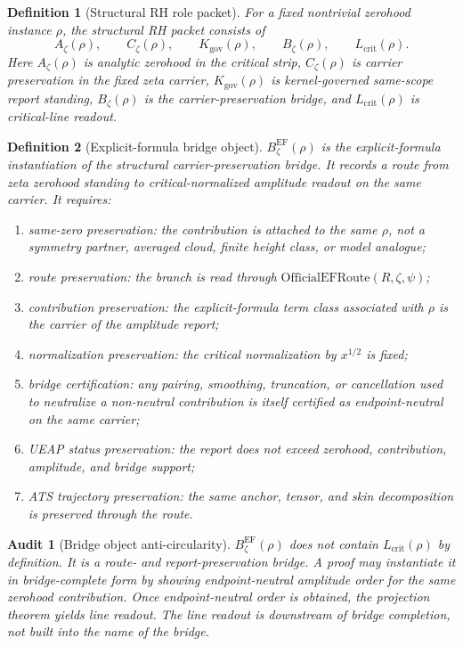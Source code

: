 \documentclass[11pt]{article}
\newtheorem{definition}{Definition}[section]
\newtheorem{audit}{Audit}[section]
\newcommand{\Az}{A_{\zeta}}
\newcommand{\Lcrit}{L_{\mathrm{crit}}}
\newcommand{\OfficialEFRoute}{\mathrm{OfficialEFRoute}}
\newcommand{\BzetaEF}{B^{\mathrm{EF}}_{\zeta}}
\newcommand{\Czeta}{C_{\zeta}}
\newcommand{\Kgov}{K_{\mathrm{gov}}}
\begin{document}
\begin{definition}[Structural RH role packet]
For a fixed nontrivial zerohood instance \(\rho\), the structural RH packet consists of
\[
\Az(\rho),\qquad \Czeta(\rho),\qquad \Kgov(\rho),\qquad B_\zeta(\rho),\qquad \Lcrit(\rho).
\]
Here \(\Az(\rho)\) is analytic zerohood in the critical strip, \(\Czeta(\rho)\) is carrier preservation in the fixed zeta carrier, \(\Kgov(\rho)\) is kernel-governed same-scope report standing, \(B_\zeta(\rho)\) is the carrier-preservation bridge, and \(\Lcrit(\rho)\) is critical-line readout.
\end{definition}

\begin{definition}[Explicit-formula bridge object]
\(\BzetaEF(\rho)\) is the explicit-formula instantiation of the structural carrier-preservation bridge.  It records a route from zeta zerohood standing to critical-normalized amplitude readout on the same carrier.  It requires:
\begin{enumerate}[label=(B\arabic*)]
\item same-zero preservation: the contribution is attached to the same \(\rho\), not a symmetry partner, averaged cloud, finite height class, or model analogue;
\item route preservation: the branch is read through \(\OfficialEFRoute(R,\zeta,\psi)\);
\item contribution preservation: the explicit-formula term class associated with \(\rho\) is the carrier of the amplitude report;
\item normalization preservation: the critical normalization by \(x^{1/2}\) is fixed;
\item bridge certification: any pairing, smoothing, truncation, or cancellation used to neutralize a non-neutral contribution is itself certified as endpoint-neutral on the same carrier;
\item UEAP status preservation: the report does not exceed zerohood, contribution, amplitude, and bridge support;
\item ATS trajectory preservation: the same anchor, tensor, and skin decomposition is preserved through the route.
\end{enumerate}
\end{definition}

\begin{audit}[Bridge object anti-circularity]
\(\BzetaEF(\rho)\) does not contain \(\Lcrit(\rho)\) by definition.  It is a route- and report-preservation bridge.  A proof may instantiate it in bridge-complete form by showing endpoint-neutral amplitude order for the same zerohood contribution.  Once endpoint-neutral order is obtained, the projection theorem yields line readout.  The line readout is downstream of bridge completion, not built into the name of the bridge.
\end{audit}
\end{document}
